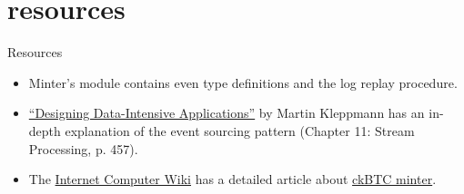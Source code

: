 \documentclass{article}
\begin{document}
\section{resources}{Resources}
\begin{itemize}
    \item
    Minter's \href{https://sourcegraph.com/github.com/dfinity/ic@1cbf1f39d31bc426c1e15b073c4ac86d75056bb2/-/blob/rs/bitcoin/ckbtc/minter/src/state/eventlog.rs}{} module contains even type definitions and the log replay procedure.
    \item
    \href{https://www.oreilly.com/library/view/designing-data-intensive-applications/9781491903063/}{``Designing Data-Intensive Applications''} by Martin Kleppmann has an in-depth explanation of the event sourcing pattern (Chapter 11: Stream Processing, p. 457).
    \item
    The \href{https://wiki.internetcomputer.org/wiki/Main_Page}{Internet Computer Wiki} has a detailed article about \href{https://wiki.internetcomputer.org/wiki/Chain-key_Bitcoin#ckBTC_Minter}{ckBTC minter}.
\end{itemize}
\end{document}
